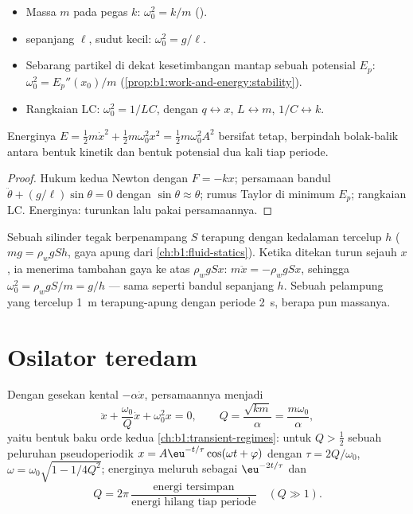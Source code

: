 \begin{proposition}\label{prop:b1:oscillators-resonance:sources}
\begin{itemize}
  \item Massa $m$ pada pegas $k$: $\omega_0^2 = k/m$ ().
  \item {} sepanjang $\ell$, sudut kecil: $\omega_0^2 = g/\ell$.
  \item Sebarang partikel di dekat kesetimbangan mantap sebuah potensial
        $E_p$: $\omega_0^2 = E_p''(x_0)/m$
        (\cref{prop:b1:work-and-energy:stability}).
  \item Rangkaian LC: $\omega_0^2 = 1/LC$, dengan $q \leftrightarrow x$,
        $L \leftrightarrow m$, $1/C \leftrightarrow k$.
\end{itemize}
Energinya $E = \tfrac12 m\dot x^2 + \tfrac12 m\omega_0^2x^2 = \tfrac12
m\omega_0^2A^2$ bersifat tetap, berpindah bolak-balik antara bentuk
kinetik dan bentuk potensial dua kali tiap periode.
\end{proposition}

\begin{proof}
Hukum kedua Newton dengan $F = -kx$; persamaan bandul
$\ddot\theta + (g/\ell)\sin\theta = 0$ dengan $\sin\theta \approx \theta$;
rumus Taylor di minimum $E_p$;  rangkaian LC. Energinya:
turunkan lalu pakai persamaannya.
\end{proof}

\begin{example}\label{ex:b1:oscillators-resonance:bob}
Sebuah silinder tegak berpenampang $S$ terapung dengan kedalaman
tercelup $h$ ($mg = \rho_wgSh$, gaya apung dari
\cref{ch:b1:fluid-statics}). Ketika ditekan turun sejauh $x$, ia
menerima tambahan gaya ke atas $\rho_wgSx$: $m\ddot x = -\rho_wgSx$,
sehingga $\omega_0^2 = \rho_wgS/m = g/h$ --- sama seperti bandul
sepanjang $h$. Sebuah pelampung yang tercelup \qty{1}{m} terapung-apung
dengan periode \qty{2}{s}, berapa pun massanya.
\end{example}

\section{Osilator teredam}

\begin{proposition}\label{prop:b1:oscillators-resonance:damped}
Dengan gesekan kental $-\alpha\dot x$, persamaannya menjadi
\[
\ddot x + \frac{\omega_0}{Q}\dot x + \omega_0^2x = 0, \qquad
Q = \frac{\sqrt{km}}{\alpha} = \frac{m\omega_0}{\alpha},
\]
yaitu bentuk baku orde kedua \cref{ch:b1:transient-regimes}: untuk
$Q > \tfrac12$ sebuah peluruhan pseudoperiodik $x = A\eu^{-t/\tau}\cos(\omega t +
\varphi)$ dengan $\tau = 2Q/\omega_0$, $\omega = \omega_0\sqrt{1 - 1/4Q^2}$;
energinya meluruh sebagai $\eu^{-2t/\tau}$ dan
\[
Q = 2\pi\,\frac{\text{energi tersimpan}}{\text{energi hilang tiap periode}}
\quad (Q \gg 1) .
\]
\end{proposition}

